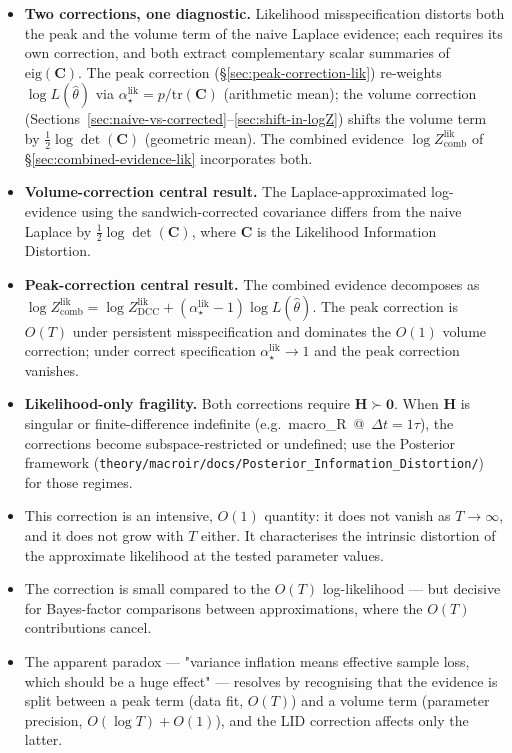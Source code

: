 \documentclass[11pt]{article}
\begin{document}
\begin{itemize}
\item \textbf{Two corrections, one diagnostic.} Likelihood misspecification distorts both the peak and the volume term of the naive Laplace evidence; each requires its own correction, and both extract complementary scalar summaries of $\mathrm{eig}(\mathbf C)$. The peak correction (\S\ref{sec:peak-correction-lik}) re-weights $\log L(\hat\theta)$ via $\alpha_\star^{\mathrm{lik}} = p/\mathrm{tr}(\mathbf C)$ (arithmetic mean); the volume correction (Sections~\ref{sec:naive-vs-corrected}--\ref{sec:shift-in-logZ}) shifts the volume term by $\tfrac{1}{2}\log\det(\mathbf C)$ (geometric mean). The combined evidence $\log Z_{\mathrm{comb}}^{\mathrm{lik}}$ of \S\ref{sec:combined-evidence-lik} incorporates both.
\item \textbf{Volume-correction central result.} The Laplace-approximated log-evidence using the sandwich-corrected covariance differs from the naive Laplace by $\tfrac{1}{2}\log\det(\mathbf C)$, where $\mathbf C$ is the Likelihood Information Distortion.
\item \textbf{Peak-correction central result.} The combined evidence decomposes as $\log Z_{\mathrm{comb}}^{\mathrm{lik}} = \log Z_{\mathrm{DCC}}^{\mathrm{lik}} + (\alpha_\star^{\mathrm{lik}}-1)\log L(\hat\theta)$. The peak correction is $O(T)$ under persistent misspecification and dominates the $O(1)$ volume correction; under correct specification $\alpha_\star^{\mathrm{lik}} \to 1$ and the peak correction vanishes.
\item \textbf{Likelihood-only fragility.} Both corrections require $\mathbf H \succ \mathbf 0$. When $\mathbf H$ is singular or finite-difference indefinite (e.g.\ macro\_R~@~$\Delta t = 1\tau$), the corrections become subspace-restricted or undefined; use the Posterior framework (\texttt{theory/macroir/docs/Posterior\_Information\_Distortion/}) for those regimes.
\item This correction is an intensive, $O(1)$ quantity: it does not vanish as $T \to \infty$, and it does not grow with $T$ either. It characterises the intrinsic distortion of the approximate likelihood at the tested parameter values.
\item The correction is small compared to the $O(T)$ log-likelihood --- but decisive for Bayes-factor comparisons between approximations, where the $O(T)$ contributions cancel.
\item The apparent paradox --- "variance inflation means effective sample loss, which should be a huge effect" --- resolves by recognising that the evidence is split between a peak term (data fit, $O(T)$) and a volume term (parameter precision, $O(\log T) + O(1)$), and the LID correction affects only the latter.

\end{itemize}
\end{document}
